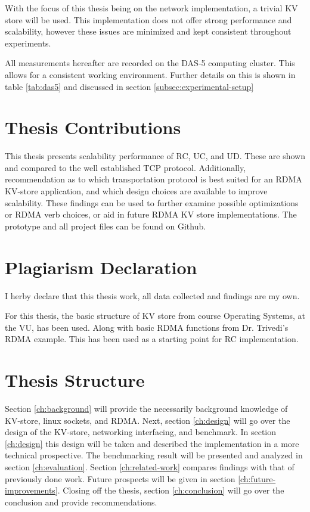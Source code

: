 With the focus of this thesis being on the network implementation, a trivial KV store will be used.
This implementation does not offer strong performance and scalability, however these issues are minimized and kept consistent throughout experiments.

All measurements hereafter are recorded on the DAS-5 computing cluster.
This allows for a consistent working environment.
Further details on this is shown in table \ref{tab:das5} and discussed in section \ref{subsec:experimental-setup}

\section{Thesis Contributions}
This thesis presents scalability performance of RC, UC, and UD.
These are shown and compared to the well established TCP protocol.
Additionally, recommendation as to which transportation protocol is best suited for an RDMA KV-store application, and which design choices are available to improve scalability.
These findings can be used to further examine possible optimizations or RDMA verb choices, or aid in future RDMA KV store implementations.
The prototype and all project files can be found on Github\cite{github}.

\section{Plagiarism Declaration}
I herby declare that this thesis work, all data collected and findings are my own.

For this thesis, the basic structure of KV store from course Operating Systems, at the VU, has been used.
Along with basic RDMA functions from Dr. Trivedi's RDMA example\cite{rdma_example}.
This has been used as a starting point for RC implementation.

\section{Thesis Structure}
Section \ref{ch:background} will provide the necessarily background knowledge of KV-store, linux sockets, and RDMA.
Next, section \ref{ch:design} will go over the design of the KV-store, networking interfacing, and benchmark.
In section \ref{ch:design} this design will be taken and described the implementation in a more technical prospective.
The benchmarking result will be presented and analyzed in section \ref{ch:evaluation}.
Section \ref{ch:related-work} compares findings with that of previously done work.
Future prospects will be given in section \ref{ch:future-improvements}.
Closing off the thesis, section \ref{ch:conclusion} will go over the conclusion and provide recommendations.